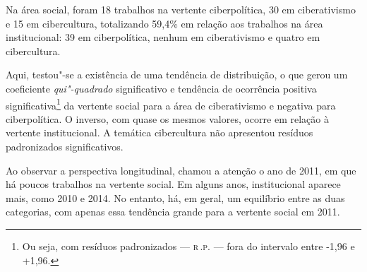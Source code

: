 Na área social, foram 18 trabalhos na vertente ciberpolítica, 30 em ciberativismo e 15 em cibercultura, totalizando 59,4\% em relação aos trabalhos na área institucional: 39 em ciberpolítica, nenhum em ciberativismo e quatro em cibercultura.

Aqui, testou"-se a existência de uma tendência de distribuição, o que
gerou um coeficiente \textit{qui"-quadrado} significativo e tendência de
ocorrência positiva significativa\footnote{Ou seja, com resíduos padronizados ---
\textsc{r\,.p.} --- fora do intervalo entre -1,96 e +1,96.} da vertente social para a
área de ciberativismo e negativa para ciberpolítica. O inverso, com
quase os mesmos valores, ocorre em relação à vertente institucional. A
temática cibercultura não apresentou resíduos padronizados
significativos.

Ao observar a perspectiva longitudinal, chamou a atenção o ano de 2011,
em que há poucos trabalhos na vertente social. Em alguns anos,
institucional aparece mais, como 2010 e 2014. No entanto, há, em geral,
um equilíbrio entre as duas categorias, com apenas essa tendência grande
para a vertente social em 2011.

